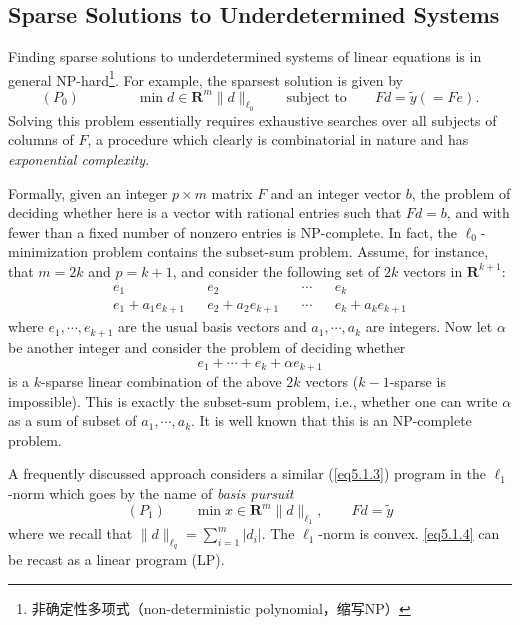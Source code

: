 \subsection{Sparse Solutions to Underdetermined Systems}
Finding sparse solutions to underdetermined systems of linear equations is in general \textcolor[rgb]{1,0,0}{NP-hard}\footnote{非确定性多项式（non-deterministic polynomial，缩写NP）}. For example, the sparsest solution is given by
\begin{equation}
    (P_0) \qquad \qquad \min\limits{d \in \mathbf{R}^m} \|d\|_{\ell_0} \qquad \text{subject to} \qquad Fd=\tilde{y}(=Fe).
    \label{eq5.1.3}
\end{equation}
Solving this problem essentially requires exhaustive searches over all subjects of columns of $F$, a procedure which clearly is combinatorial in nature and has \emph{exponential complexity}.

Formally, given an integer $p \times m$ matrix $F$ and an integer vector $b$, the problem of deciding whether here is a vector with rational entries such that $Fd=b$, and with fewer than a fixed number of nonzero entries is \textcolor[rgb]{1,0,0}{NP-complete}. In fact, the $\ell_0$-minimization problem contains the subset-sum problem. Assume, for instance, that $m=2k$ and $p=k+1$, and consider the following set of $2k$ vectors in $\mathbf{R}^{k+1}$:
\[
    \begin{array}{ccccccccc}
        &e_1& &e_2& &\cdots& &e_k&\\
        &e_1+a_1e_{k+1}& &e_2+a_2e_{k+1}& &\cdots& &e_k+a_ke_{k+1}&
    \end{array}
\]
where $e_1,\cdots, e_{k+1}$ are the usual basis vectors and $a_1,\cdots, a_k$ are integers. Now let $\alpha$ be another integer and consider the problem of deciding whether
\[
    e_1+\cdots+e_k+\alpha e_{k+1}
\]
is a $k$-sparse linear combination of the above $2k$ vectors ($k-1$-sparse is impossible). This is exactly the subset-sum problem, i.e., whether one can write $\alpha$ as a sum of subset of $a_1,\cdots,a_k$. It is well known that this is an \textcolor[rgb]{1,0,0}{NP-complete} problem.

A frequently discussed approach considers a similar (\cref{eq5.1.3}) program in the $\ell_1$-norm which goes by the name of \emph{basis pursuit} \cite{22}
\begin{equation}
    (P_1) \qquad \min\limits{x \in \mathbf{R}^m} \|d\|_{\ell_1}, \qquad Fd = \tilde{y}
    \label{eq5.1.4}
\end{equation}
where we recall that $\|d\|_{\ell_q}=\sum_{i=1}^m |d_i|$. \textcolor[rgb]{1,0,0}{The $\ell_1$-norm is convex}. \cref{eq5.1.4} can be recast as a \textcolor[rgb]{1,0,0}{linear program (LP)}.

